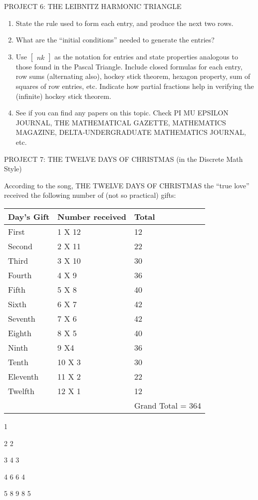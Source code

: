 PROJECT 6: THE LEIBNITZ HARMONIC TRIANGLE

\begin{enumerate}
\def\labelenumi{\arabic{enumi}.}

\item
  State the rule used to form each entry, and produce the next two rows.
\item
  What are the ``initial conditions'' needed to generate the entries?
\item
  Use \(\begin{bmatrix}
  n
  k
  \end{bmatrix}
\) as the notation for entries and state properties
  analogous to those found in the Pascal Triangle. Include closed
  formulas for each entry, row sums (alternating also), hockey stick
  theorem, hexagon property, sum of squares of row entries, etc.
  Indicate how partial fractions help in verifying the (infinite) hockey
  stick theorem.
\item
  See if you can find any papers on this topic. Check PI MU EPSILON
  JOURNAL, THE MATHEMATICAL GAZETTE, MATHEMATICS MAGAZINE,
  DELTA-UNDERGRADUATE MATHEMATICS JOURNAL, etc.

\end{enumerate}

PROJECT 7: THE TWELVE DAYS OF CHRISTMAS (in the Discrete Math Style)

According to the song, THE TWELVE DAYS OF CHRISTMAS the ``true love''
received the following number of (not so practical) gifts:
\begin{longtable}[]{@{}lll@{}}
\toprule
Day's Gift & Number received & Total\tabularnewline
\midrule
\endhead
First & 1 X 12 & 12\tabularnewline
Second & 2 X 11 & 22\tabularnewline
Third & 3 X 10 & 30\tabularnewline
Fourth & 4 X 9 & 36\tabularnewline
Fifth & 5 X 8 & 40\tabularnewline
Sixth & 6 X 7 & 42\tabularnewline
Seventh & 7 X 6 & 42\tabularnewline
Eighth & 8 X 5 & 40\tabularnewline
Ninth & 9 X4 & 36\tabularnewline
Tenth & 10 X 3 & 30\tabularnewline
Eleventh & 11 X 2 & 22\tabularnewline
Twelfth & 12 X 1 & 12\tabularnewline
& & Grand Total = 364\tabularnewline
\bottomrule

\end{longtable}

1

2 2

3 4 3

4 6 6 4

5 8 9 8 5

